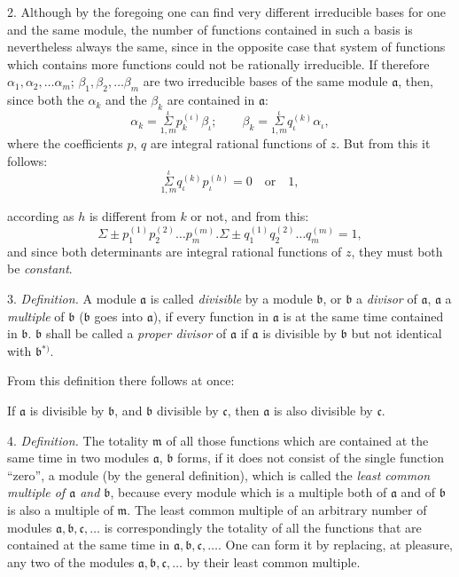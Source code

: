 \documentclass{article}
\begin{document}
2. Although by the foregoing one can find very different irreducible bases for one and the same module, the number of functions contained in such a basis is nevertheless always the same, since in the opposite case that system of functions which contains more functions could not be rationally irreducible. If therefore $\alpha_{1}, \alpha_{2}, \ldots \alpha_{m}$; $\beta_{1}, \beta_{2}, \ldots \beta_{m}$ are two irreducible bases of the same module $\mathfrak{a}$, then, since both the $\alpha_{k}$ and the $\beta_{k}$ are contained in $\mathfrak{a}$:
\[ \alpha_{k} = \overset{\iota}{\underset{1,m}{\Sigma}} p_{k}^{(\iota)}\beta_{\iota}; \qquad \beta_{k} = \overset{\iota}{\underset{1,m}{\Sigma}} q_{\iota}^{(k)}\alpha_{\iota}, \]
where the coefficients $p$, $q$ are integral rational functions of $z$. But from this it follows:
\[ \overset{\iota}{\underset{1,m}{\Sigma}} q_{\iota}^{(k)}p_{\iota}^{(h)} = 0 \quad \text{or} \quad 1, \]

according as $h$ is different from $k$ or not, and from this:
\[ \Sigma \pm p_{1}^{(1)}p_{2}^{(2)}\ldots p_{m}^{(m)}.\Sigma \pm q_{1}^{(1)}q_{2}^{(2)}\ldots q_{m}^{(m)} = 1, \]
and since both determinants are integral rational functions of $z$, they must both be \emph{constant}.

3. \emph{Definition.} A module $\mathfrak{a}$ is called \emph{divisible} by a module $\mathfrak{b}$, or $\mathfrak{b}$ a \emph{divisor} of $\mathfrak{a}$, $\mathfrak{a}$ a \emph{multiple} of $\mathfrak{b}$ ($\mathfrak{b}$ goes into $\mathfrak{a}$), if every function in $\mathfrak{a}$ is at the same time contained in $\mathfrak{b}$. $\mathfrak{b}$ shall be called a \emph{proper divisor} of $\mathfrak{a}$ if $\mathfrak{a}$ is divisible by $\mathfrak{b}$ but not identical with $\mathfrak{b}$${}^{*)}$.

From this definition there follows at once:

If $\mathfrak{a}$ is divisible by $\mathfrak{b}$, and $\mathfrak{b}$ divisible by $\mathfrak{c}$, then $\mathfrak{a}$ is also divisible by $\mathfrak{c}$.

4. \emph{Definition.} The totality $\mathfrak{m}$ of all those functions which are contained at the same time in two modules $\mathfrak{a}$, $\mathfrak{b}$ forms, if it does not consist of the single function ``zero'', a module (by the general definition), which is called the \emph{least common multiple of $\mathfrak{a}$ and $\mathfrak{b}$}, because every module which is a multiple both of $\mathfrak{a}$ and of $\mathfrak{b}$ is also a multiple of $\mathfrak{m}$. The least common multiple of an arbitrary number of modules $\mathfrak{a}, \mathfrak{b}, \mathfrak{c}, \ldots$ is correspondingly the totality of all the functions that are contained at the same time in $\mathfrak{a}, \mathfrak{b}, \mathfrak{c}, \ldots$. One can form it by replacing, at pleasure, any two of the modules $\mathfrak{a}, \mathfrak{b}, \mathfrak{c}, \ldots$ by their least common multiple.
\end{document}
